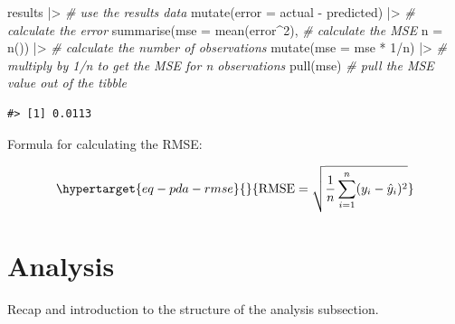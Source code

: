 \documentclass[
  letterpaper,
]{scrbook}
\newenvironment{Shaded}{\begin{snugshade}}{\end{snugshade}}
\newcommand{\AttributeTok}[1]{\textcolor[rgb]{0.00,0.00,0.00}{#1}}
\newcommand{\CommentTok}[1]{\textcolor[rgb]{0.00,0.00,0.00}{\textit{#1}}}
\newcommand{\DecValTok}[1]{\textcolor[rgb]{0.00,0.00,0.00}{#1}}
\newcommand{\FunctionTok}[1]{\textcolor[rgb]{0.00,0.00,0.00}{#1}}
\newcommand{\NormalTok}[1]{\textcolor[rgb]{0.00,0.00,0.00}{#1}}
\newcommand{\SpecialCharTok}[1]{\textcolor[rgb]{0.00,0.00,0.00}{#1}}
\begin{document}
\begin{Shaded}
\begin{Highlighting}[]
\NormalTok{results }\SpecialCharTok{|\textgreater{}} \CommentTok{\# use the \textasciigrave{}results\textasciigrave{} data}
    \FunctionTok{mutate}\NormalTok{(}\AttributeTok{error =}\NormalTok{ actual }\SpecialCharTok{{-}}\NormalTok{ predicted) }\SpecialCharTok{|\textgreater{}} \CommentTok{\# calculate the error}
    \FunctionTok{summarise}\NormalTok{(}\AttributeTok{mse =} \FunctionTok{mean}\NormalTok{(error}\SpecialCharTok{\^{}}\DecValTok{2}\NormalTok{),  }\CommentTok{\# calculate the MSE}
              \AttributeTok{n =} \FunctionTok{n}\NormalTok{()) }\SpecialCharTok{|\textgreater{}}  \CommentTok{\# calculate the number of observations}
    \FunctionTok{mutate}\NormalTok{(}\AttributeTok{mse =}\NormalTok{ mse }\SpecialCharTok{*} \DecValTok{1}\SpecialCharTok{/}\NormalTok{n) }\SpecialCharTok{|\textgreater{}}  \CommentTok{\# multiply by 1/n to get the MSE for n observations}
    \FunctionTok{pull}\NormalTok{(mse) }\CommentTok{\# pull the MSE value out of the tibble}
\end{Highlighting}
\end{Shaded}

\begin{verbatim}
#> [1] 0.0113
\end{verbatim}

Formula for calculating the RMSE:

\begin{equation}\protect\hypertarget{eq-pda-rmse}{}{
\text{RMSE} = \sqrt{\frac{1}{n} \sum_{i=1}^{n} (y_i - \hat{y}_i)^2}
}\label{eq-pda-rmse}\end{equation}

\hypertarget{pda-analysis}{%
\section{Analysis}\label{pda-analysis}}

Recap and introduction to the structure of the analysis subsection.
\end{document}
